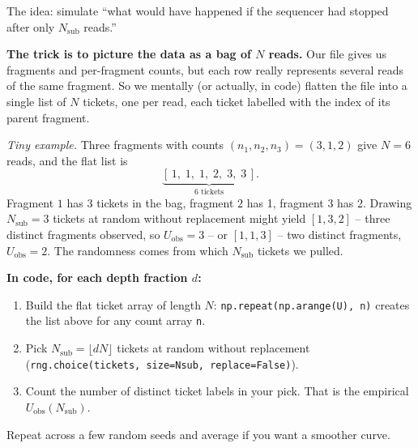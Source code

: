 \documentclass[11pt]{article}
\newcommand{\Nsub}{N_{\mathrm{sub}}}
\newcommand{\Uobs}{U_{\mathrm{obs}}}
\begin{document}
\begin{tcolorbox}[breakable,colback=blue!4,colframe=blue!55!black,title=\textbf{Option A: random subsampling (Monte Carlo)}]
The idea: simulate ``what would have happened if the sequencer had stopped after only
$\Nsub$ reads.''

\textbf{The trick is to picture the data as a bag of $N$ reads.} Our file gives us
fragments and per-fragment counts, but each row really represents several reads of the
same fragment. So we mentally (or actually, in code) flatten the file into a single
list of $N$ tickets, one per read, each ticket labelled with the index of its parent
fragment.

\emph{Tiny example.} Three fragments with counts $(n_1, n_2, n_3) = (3, 1, 2)$ give
$N = 6$ reads, and the flat list is
\[
   \underbrace{[\,1,\;1,\;1,\;2,\;3,\;3\,]}_{\text{6 tickets}}.
\]
Fragment $1$ has 3 tickets in the bag, fragment $2$ has 1, fragment $3$ has 2. Drawing
$\Nsub = 3$ tickets at random without replacement might yield $[1, 3, 2]$ -- three
distinct fragments observed, so $\Uobs = 3$ -- or $[1, 1, 3]$ -- two distinct fragments,
$\Uobs = 2$. The randomness comes from which $\Nsub$ tickets we pulled.

\textbf{In code, for each depth fraction $d$:}
\begin{enumerate}[leftmargin=2em,itemsep=2pt]
  \item Build the flat ticket array of length $N$: \texttt{np.repeat(np.arange(U), n)}
        creates the list above for any count array \texttt{n}.
  \item Pick $\Nsub = \lfloor dN \rfloor$ tickets at random without replacement
        (\texttt{rng.choice(tickets, size=Nsub, replace=False)}).
  \item Count the number of distinct ticket labels in your pick. That is the empirical
        $\Uobs(\Nsub)$.
\end{enumerate}
Repeat across a few random seeds and average if you want a smoother curve.
\end{tcolorbox}
\end{document}
